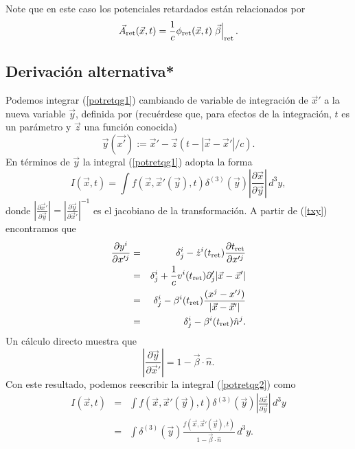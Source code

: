 Note que en este caso los potenciales retardados están relacionados por
\begin{equation}
\vec{A}_{\rm ret}(\vec{x},t)=\frac{1}{c}\phi_{\rm ret}(\vec{x},t)\left.\vec{\beta}\right|_{\rm ret}.
\end{equation}


\subsection{Derivación alternativa*}
Podemos integrar (\ref{potretqg1}) cambiando de variable de integración de $\vec{x}'$ a la nueva variable $\vec{y}$, definida por (recuérdese que, para efectos de la integración, $t$ es un parámetro y $\vec{z}$ una función conocida)
\begin{equation}
 \vec{y}(\vec{x'}):=\vec{x}'-\vec{z}(t-|\vec{x}-\vec{x}'|/c). \label{txy}
\end{equation}
En términos de $\vec{y}$ la integral (\ref{potretqg1}) adopta la forma
\begin{equation}
I(\vec{x},t)=\int f(\vec{x},\vec{x}'(\vec{y}),t)\delta^{(3)}(\vec{y})
\left|\frac{\partial \vec{x}}{\partial \vec{y}}\right|\,d^3y, \label{potretqg2}
\end{equation}
donde $\left|\frac{\partial \vec{x}'}{\partial \vec{y}}\right|=\left|\frac{\partial \vec{y}}{\partial \vec{x}'}\right|^{-1}$ es el jacobiano de la transformación. A partir de (\ref{txy}) encontramos que
\begin{eqnarray}
\frac{\partial y^i}{\partial x'^j}&=&\delta^i_j-\dot{z}^i(t_{\rm ret})\frac{\partial t_{\rm ret}}{\partial x'^j} \\
&=&\delta^i_j+\frac{1}{c}v^i(t_{\rm ret})\partial'_j|\vec{x}-\vec{x}'|\\
&=&\delta^i_j-\beta^i(t_{\rm ret})\frac{(x^j-x'^j)}{|\vec{x}-\vec{x}'|}\\
&=&\delta^i_j-\beta^i(t_{\rm ret})\hat{n}^j.
\end{eqnarray}
Un cálculo directo muestra que
\begin{equation}
 \left|\frac{\partial \vec{y}}{\partial \vec{x}'}\right|=1-\vec\beta\cdot\hat{n}.
\end{equation}
Con este resultado, podemos reescribir la integral (\ref{potretqg2}) como
\begin{eqnarray}
I(\vec{x},t)&=&\int f(\vec{x},\vec{x}'(\vec{y}),t)\delta^{(3)}(\vec{y})
\left|\frac{\partial \vec{x}}{\partial \vec{y}}\right|\,d^3y \\
&=&\int \delta^{(3)}(\vec{y})
\frac{f(\vec{x},\vec{x}'(\vec{y}),t)}{1-\vec\beta\cdot\hat{n} }\,d^3y . \label{potretqg3}
\end{eqnarray}
